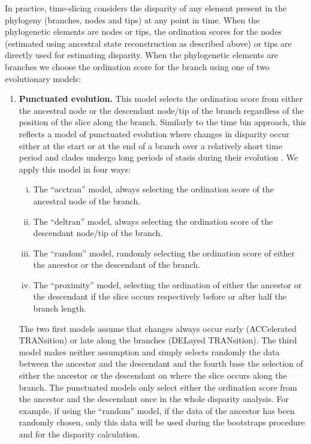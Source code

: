 \documentclass[12pt,a4paper]{article}
\begin{document}
In practice, time-slicing considers the disparity of any element present in the phylogeny (branches, nodes and tips) at any point in time.
When the phylogenetic elements are nodes or tips, the ordination scores for the nodes (estimated using ancestral state reconstruction as described above) or tips are directly used for estimating disparity.
When the phylogenetic elements are branches we choose the ordination score for the branch using one of two evolutionary models:



\begin{enumerate}

    \item{\textbf{Punctuated evolution.}} 
    This model selects the ordination score from either the ancestral node or the descendant node/tip of the branch regardless of the position of the slice along the branch. 
    Similarly to the time bin approach, this reflects a model of punctuated evolution where changes in disparity occur either at the start or at the end of a branch over a relatively short time period and clades undergo long periods of stasis during their evolution \citep{Gould1977,Hunt20112007}.
    We apply this model in four ways: 

    \begin{enumerate}[(i)]

      \item The ``acctran'' model, always selecting the ordination score of the ancestral node of the branch.
      \item The ``deltran'' model, always selecting the ordination score of the descendant node/tip of the branch.
      \item The ``random'' model, randomly selecting the ordination score of either the ancestor or the descendant of the branch.
      \item The ``proximity'' model, selecting the ordination of either the ancestor or the descendant if the slice occurs respectively before or after half the branch length.

    \end{enumerate}

    The two first models assume that changes always occur early (ACCelerated TRANsition) or late along the branches (DELayed TRANsition).
    The third model makes neither assumption and simply selects randomly the data between the ancestor and the descendant and the fourth base the selection of either the ancestor or the descendant on where the slice occurs along the branch.
    The punctuated models only select either the ordination score from the ancestor and the descendant once in the whole disparity analysis.
    For example, if using the ``random'' model, if the data of the ancestor has been randomly chosen, only this data will be used during the bootstraps procedure and for the disparity calculation.
    

\end{enumerate}
\end{document}
